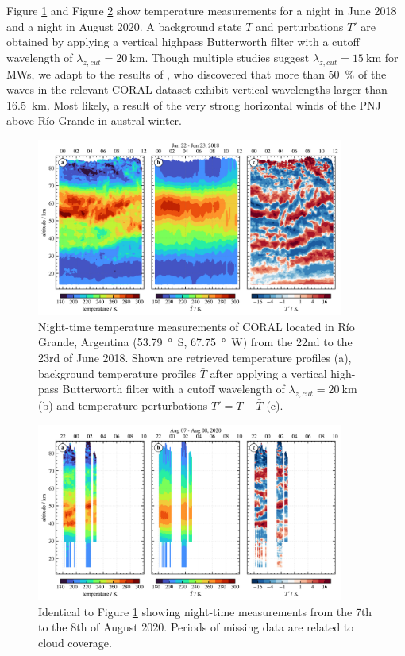 Figure \ref{fig:coral_2018} and Figure \ref{fig:coral_2020} show temperature measurements for a night in June 2018 and a night in August 2020. A background state $\bar{T}$ and perturbations $T'$ are obtained by applying a vertical highpass Butterworth filter with a cutoff wavelength of $\lambda_{z,cut}=\SI{20}{\kilo\meter}$. Though multiple studies suggest $\lambda_{z,cut}=\SI{15}{\kilo\meter}$ for MWs, we adapt to the results of \textcite[]{reichert_characterization_2022}, who discovered that more than \SI{50}{\percent} of the waves in the relevant CORAL dataset exhibit vertical wavelengths larger than \SI{16.5}{\kilo\meter}. Most likely, a result of the very strong horizontal winds of the PNJ above Río Grande in austral winter.
\begin{figure}[tbp]
    \centering
    \includegraphics[width=0.9\textwidth]{figures_lidar/coral_event_20180622.png}
    \caption{Night-time temperature measurements of CORAL located in Río Grande, Argentina (\SI{53.79}{\degree S}, \SI{67.75}{\degree W}) from the 22nd to the 23rd of June 2018. Shown are retrieved temperature profiles (a), background temperature profiles $\bar{T}$ after applying a vertical high-pass Butterworth filter with a cutoff wavelength of $\lambda_{z,cut}=\SI{20}{\kilo\meter}$ (b) and temperature perturbations $T'=T-\bar{T}$ (c).}
    \label{fig:coral_2018}
\end{figure}
\begin{figure}[tbp]
    \centering
    \includegraphics[width=0.9\textwidth]{figures_lidar/coral_event_20200807.png}
    \caption{Identical to Figure \ref{fig:coral_2018} showing night-time measurements from the 7th to the 8th of August 2020. Periods of missing data are related to cloud coverage.}
    \label{fig:coral_2020}
\end{figure}
